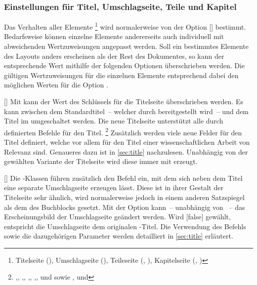 \subsubsection{Einstellungen für Titel, Umschlagseite, Teile und Kapitel}
Das Verhalten aller Elemente%
\footnote{%
  Titelseite (), Umschlagseite (),
  Teileseite (, ),
  Kapitelseite (, )%
}
wird normalerweise von der Option [\PSet] bestimmt. Bedarfsweise 
können einzelne Elemente andererseits auch individuell mit abweichenden 
Wertzuweisungen angepasst werden. Soll ein bestimmtes Elemente des Layouts 
anders erscheinen als der Rest des Dokumentes, so kann der entsprechende Wert 
mithilfe der folgenden Optionen überschrieben werden. Die gültigen 
Wertzuweisungen für die einzelnen Elemente entsprechend dabei den möglichen 
Werten für die Option .

\begin{Declaration}{[\PSet]}
\printdeclarationlist%
%
%
Mit  kann der Wert des Schlüssels  für die 
Titelseite überschrieben werden. Es kann zwischen dem Standardtitel~-- welcher 
durch \KOMAScript{} bereitgestellt wird~-- und dem Titel im \CD umgeschaltet 
werden. Die neue Titelseite unterstützt alle durch \KOMAScript{} definierten 
Befehle für den Titel.%
\footnote{\raggedright%
  ,,
  ,,
  ,,
  ,,
   und  sowie
  ,
  und 
}
Zusätzlich werden viele neue Felder für den Titel definiert, welche vor allem 
für den Titel einer wissenschaftlichen Arbeit von Relevanz sind. Genaueres dazu 
ist in \autoref{sec:title} nachzulesen. Unabhängig von der gewählten Variante 
der Titelseite wird diese immer mit  erzeugt.
\end{Declaration}

\begin{Declaration}[v2.02]{[\PSet]}
\printdeclarationlist%
%
%
%
Die \TUDScript-Klassen führen zusätzlich den Befehl  ein, mit 
dem sich neben dem Titel eine separate Umschlagseite erzeugen lässt. Diese ist 
in ihrer Gestalt der Titelseite sehr ähnlich, wird normalerweise jedoch in 
einem anderen Satzspiegel als dem des Buchblocks gesetzt. Mit der Option 
 kann~-- unabhängig von ~-- das Erscheinungsbild 
der Umschlagseite geändert werden. Wird [false] gewählt, 
entspricht die Umschlagseite dem originalen \KOMAScript-Titel. Die Verwendung 
des Befehls  sowie die dazugehörigen Parameter werden 
detailliert in \autoref{sec:title} erläutert.
\end{Declaration}

